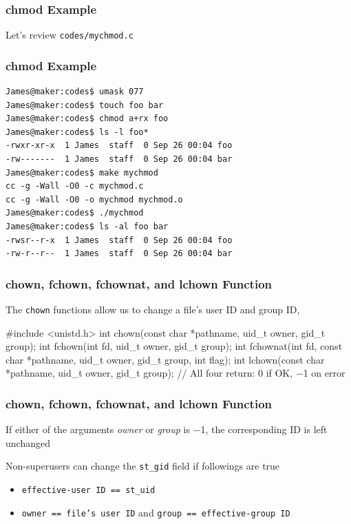\documentclass[newPxFont,sthlmFooter,nooffset]{beamer}
\begin{document}
\begin{frame}[containsverbatim,t]
  \frametitle{chmod Example}
Let's review \texttt{codes/mychmod.c}

\end{frame}

\begin{frame}
  \frametitle{chmod Example}
\begin{verbatim}
James@maker:codes$ umask 077
James@maker:codes$ touch foo bar
James@maker:codes$ chmod a+rx foo
James@maker:codes$ ls -l foo*
-rwxr-xr-x  1 James  staff  0 Sep 26 00:04 foo
-rw-------  1 James  staff  0 Sep 26 00:04 bar
James@maker:codes$ make mychmod
cc -g -Wall -O0 -c mychmod.c
cc -g -Wall -O0 -o mychmod mychmod.o
James@maker:codes$ ./mychmod
James@maker:codes$ ls -al foo bar
-rwsr--r-x  1 James  staff  0 Sep 26 00:04 foo
-rw-r--r--  1 James  staff  0 Sep 26 00:04 bar
\end{verbatim}
\end{frame}


\begin{frame}[containsverbatim,t]
  \frametitle{chown, fchown, fchownat, and lchown Function}
The \texttt{chown} functions allow us to change a file’s user ID and group ID, 

\bigskip
\begin{codedef}
#include <unistd.h>
int chown(const char *pathname, uid_t owner, gid_t group);
int fchown(int fd, uid_t owner, gid_t group);
int fchownat(int fd, const char *pathname, uid_t owner, gid_t group, int flag);
int lchown(const char *pathname, uid_t owner, gid_t group);
// All four return: 0 if OK, −1 on error
\end{codedef}
\end{frame}


\begin{frame}[t]
  \frametitle{chown, fchown, fchownat, and lchown Function}
If either of the arguments \textit{owner} or \textit{group} is −1, the corresponding ID is left unchanged

\bigskip
Non-superusers can change the \texttt{st\_gid} field if followings are true
\begin{itemize}
\item \texttt{effective-user ID == st\_uid}
\item \texttt{owner == file's user ID} and \texttt{group == effective-group ID}
\end{itemize}
\end{frame}
\end{document}
